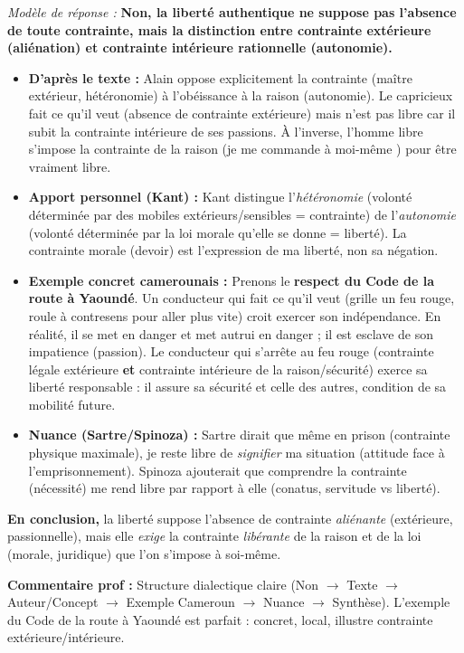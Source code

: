 \documentclass[11pt]{article}
\newcommand{\cle}[1]{{\popxbold\color{popdark}#1}}
\begin{document}
\begin{exoresolu}
\emph{Modèle de réponse :}
\og \textbf{Non, la liberté authentique ne suppose pas l'absence de toute contrainte, mais la distinction entre contrainte extérieure (aliénation) et contrainte intérieure rationnelle (\cle{autonomie}).}
\begin{itemize}
    \item \textbf{D'après le texte :} Alain oppose explicitement la \og contrainte \fg (maître extérieur, hétéronomie) à l'\og obéissance à la raison \fg (autonomie). Le capricieux \og fait ce qu'il veut \fg (absence de contrainte extérieure) mais n'est \og pas libre \fg car il subit la contrainte intérieure de ses passions. À l'inverse, l'homme libre s'impose la contrainte de la raison (\og je me commande à moi-même \fg) pour être vraiment libre.
    \item \textbf{Apport personnel (Kant) :} Kant distingue l'\emph{hétéronomie} (volonté déterminée par des mobiles extérieurs/sensibles = contrainte) de l'\emph{autonomie} (volonté déterminée par la loi morale qu'elle se donne = liberté). La contrainte morale (devoir) est l'expression de ma liberté, non sa négation.
    \item \textbf{Exemple concret camerounais :} Prenons le \textbf{respect du Code de la route à Yaoundé}. Un conducteur qui \og fait ce qu'il veut \fg (grille un feu rouge, roule à contresens pour aller plus vite) croit exercer son indépendance. En réalité, il se met en danger et met autrui en danger ; il est esclave de son impatience (passion). Le conducteur qui s'arrête au feu rouge (contrainte légale extérieure \textbf{et} contrainte intérieure de la raison/sécurité) exerce sa liberté responsable : il assure sa sécurité et celle des autres, condition de sa mobilité future.
    \item \textbf{Nuance (Sartre/Spinoza) :} Sartre dirait que même en prison (contrainte physique maximale), je reste libre de \emph{signifier} ma situation (attitude face à l'emprisonnement). Spinoza ajouterait que comprendre la contrainte (nécessité) me rend libre par rapport à elle (\cle{conatus}, \cle{servitude} vs liberté).
\end{itemize}
\textbf{En conclusion,} la liberté suppose l'absence de contrainte \emph{aliénante} (extérieure, passionnelle), mais elle \emph{exige} la contrainte \emph{libérante} de la raison et de la loi (morale, juridique) que l'on s'impose à soi-même. \fg

\textbf{Commentaire prof :} Structure dialectique claire (Non $\rightarrow$ Texte $\rightarrow$ Auteur/Concept $\rightarrow$ Exemple Cameroun $\rightarrow$ Nuance $\rightarrow$ Synthèse). L'exemple du Code de la route à Yaoundé est parfait : concret, local, illustre contrainte extérieure/intérieure.


\end{exoresolu}
\end{document}
